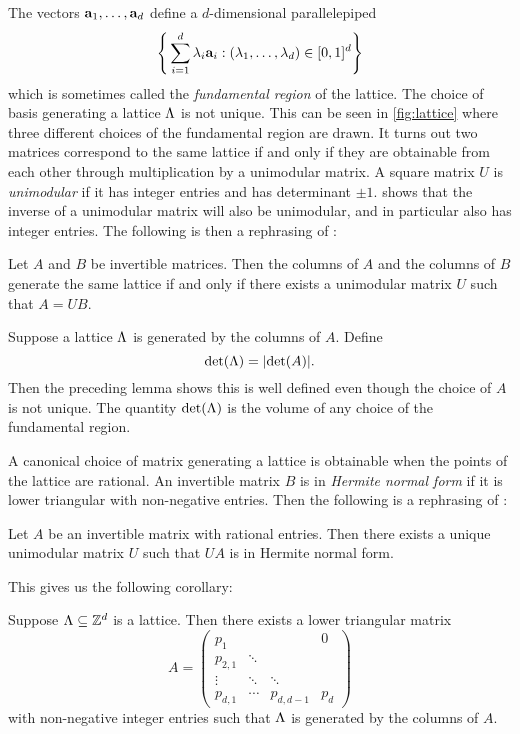 The vectors ${\mathbf a}_1, \ldots, {\mathbf a}_d$ define a $d$-dimensional parallelepiped
\begin{equation*}
    \Bigg\{\sum_{i=1}^d \lambda_i {\mathbf a}_i : (\lambda_1, \ldots, \lambda_d) \in [0, 1]^d \Bigg\}
\end{equation*}
which is sometimes called the \emph{fundamental region} of the lattice. The choice of basis generating a lattice $\Lambda$ is not unique. This can be seen in \cref{fig:lattice} where three different choices of the fundamental region are drawn. It turns out two matrices correspond to the same lattice if and only if they are obtainable from each other through multiplication by a unimodular matrix. A square matrix $U$ is \emph{unimodular} if it has integer entries and has determinant $\pm 1$. \cite[Theorem 4.3]{schrijverTheoryLinearInteger1998} shows that the inverse of a unimodular matrix will also be unimodular, and in particular also has integer entries. The following is then a rephrasing of \cite[Corollary 4.3a]{schrijverTheoryLinearInteger1998}:
\begin{lemma}
    Let $A$ and $B$ be invertible matrices. Then the columns of $A$ and the columns of $B$ generate the same lattice if and only if there exists a unimodular matrix $U$ such that $A = UB$.
\end{lemma}
Suppose a lattice $\Lambda$ is generated by the columns of $A$. Define
\begin{equation*}
    \det(\Lambda) = \lvert\det(A)\rvert.
\end{equation*}
Then the preceding lemma shows this is well defined even though the choice of $A$ is not unique. The quantity $\det(\Lambda)$ is the volume of any choice of the fundamental region.

A canonical choice of matrix generating a lattice is obtainable when the points of the lattice are rational. An invertible matrix $B$ is in \emph{Hermite normal form} if it is lower triangular with non-negative entries. Then the following is a rephrasing of \cite[Corollary 4.3b]{schrijverTheoryLinearInteger1998}:
\begin{lemma}
    Let $A$ be an invertible matrix with rational entries. Then there exists a unique unimodular matrix $U$ such that $UA$ is in Hermite normal form.
\end{lemma}
This gives us the following corollary:
\begin{lemma}
    \label{lem:zd-triangular}
    Suppose $\Lambda \subseteq {\mathbb Z}^d$ is a lattice. Then there exists a lower triangular matrix
    \begin{equation*}
        A = \begin{pmatrix}
            p_1 & & & 0 \\
            p_{2,1} & \ddots & & \\
            \vdots & \ddots & \ddots & \\
            p_{d,1} & \cdots & p_{d, d-1} & p_d
        \end{pmatrix}
    \end{equation*}
    with non-negative integer entries such that $\Lambda$ is generated by the columns of $A$.
\end{lemma}

